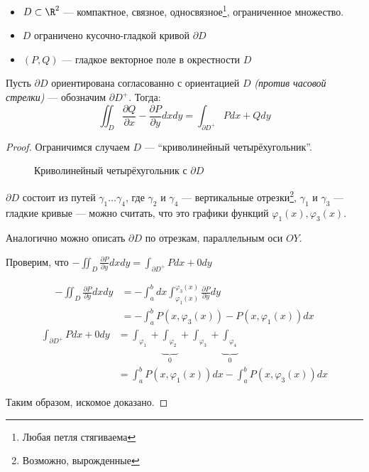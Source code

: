 \begin{theorem}\itemfix
    \begin{itemize}
        \item \(D\subset \R^2\) --- компактное, связное, односвязное\footnote{Любая петля стягиваема}, ограниченное множество.
        \item \(D\) ограничено кусочно-гладкой кривой \(\partial D\)
        \item \((P, Q)\) --- гладкое векторное поле в окрестности \(D\)
    \end{itemize}

    Пусть \(\partial D\) ориентирована согласованно с ориентацией \(D\) \textit{(против часовой стрелки)} --- обозначим \(\partial D^{ +}\). Тогда:
    \[\iint_D \frac{\partial Q}{\partial x} - \frac{\partial P}{\partial y} dx dy = \int_{\partial D^{ +}} Pdx + Qdy\]
\end{theorem}
\begin{proof}
    Ограничимся случаем \(D\) --- ``криволинейный четырёхугольник''.

    \begin{figure}[h]
        
        \centering
        \caption{Криволинейный четырёхугольник с \(\partial D\)}
    \end{figure}

    \(\partial D\) состоит из путей \(\gamma_1 \dots \gamma_4\), где \(\gamma_2\) и \(\gamma_4\) --- вертикальные отрезки\footnote{Возможно, вырожденные}, \(\gamma_1\) и \(\gamma_3\) --- гладкие кривые --- можно считать, что это графики функций \(\varphi_1(x), \varphi_3(x)\).

    Аналогично можно описать \(\partial D\) по отрезкам, параллельным оси \(OY\). %

    Проверим, что \( - \iint_D \frac{\partial P}{\partial y} dx dy = \int_{\partial D^{ +}} Pdx + 0 dy\)

    \begin{align*}
        - \iint_D \frac{\partial P}{\partial y} dx dy & = -\int_a^b dx \int_{\varphi_1(x)}^{\varphi_3(x)} \frac{\partial P}{\partial y} dy \\
                                                      & = -\int_a^b P(x, \varphi_3(x)) - P(x, \varphi_1(x)) dx
    \end{align*}
    \begin{align*}
        \int_{\partial D^{ +}} Pdx + 0 dy & = \int_{\varphi_1} + \underbrace{\int_{\varphi_2}}_0 + \int_{\varphi_3} + \underbrace{\int_{\varphi_4}}_0 \\
                                          & = \int_a^b P(x, \varphi_1(x)) dx - \int_a^b P(x, \varphi_3(x)) dx
    \end{align*}

    Таким образом, искомое доказано.
\end{proof}

